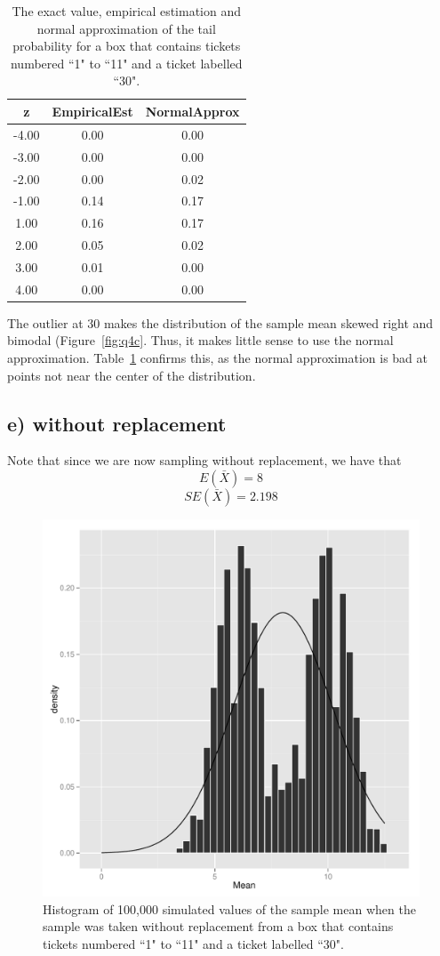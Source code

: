 \documentclass[11pt]{article}
\begin{document}
\begin{table}[H]
\centering
\begin{tabular}{|c|cc|}
  \hline
z & EmpiricalEst & NormalApprox \\ 
  \hline
-4.00 & 0.00 & 0.00 \\ 
  -3.00 & 0.00 & 0.00 \\ 
  -2.00 & 0.00 & 0.02 \\ 
  -1.00 & 0.14 & 0.17 \\ 
  1.00 & 0.16 & 0.17 \\ 
  2.00 & 0.05 & 0.02 \\ 
  3.00 & 0.01 & 0.00 \\ 
  4.00 & 0.00 & 0.00 \\ 
   \hline
\end{tabular}
\caption{The exact value, empirical estimation and normal approximation of the tail probability for a box that contains tickets numbered ``1" to ``11" and a ticket labelled ``30".} \label{tab:q4c}
\end{table}

\noindent The outlier at $30$ makes the distribution of the sample mean skewed right and bimodal (Figure~\ref{fig:q4c}.  Thus, it makes little sense to use the normal approximation.  Table~\ref{tab:q4c} confirms this, as the normal approximation is bad at points not near the center of the distribution.



\subsection*{e) without replacement}


\noindent Note that since we are now sampling without replacement, we have that
$$E(\bar{X})= 8$$ 
$$SE(\bar{X}) = 2.198$$


\begin{figure}[H]
\centering
\includegraphics[width = .5\textwidth]{histogram_4e-1.pdf}
\caption{Histogram of 100,000 simulated values of the sample mean when the sample was taken without replacement from a box that contains tickets numbered ``1" to ``11" and a ticket labelled ``30".}\label{fig:q4e}
\end{figure}
\end{document}
